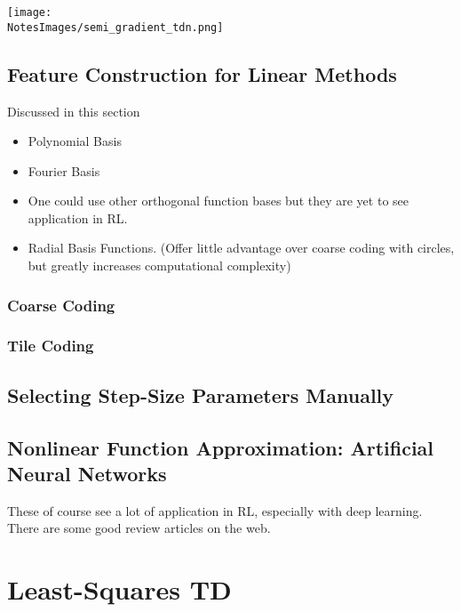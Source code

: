 \texttt{[image: \\NotesImages/semi\_gradient\_tdn.png]}\\


\subsection{Feature Construction for Linear Methods}
Discussed in this section
\begin{itemize}
    \item Polynomial Basis
    \item Fourier Basis
    \item One could use other orthogonal function bases but they are yet to see application in RL.
    \item Radial Basis Functions. (Offer little advantage over coarse coding with circles, but greatly increases computational complexity)
\end{itemize}

\setcounter{subsubsection}{2}
\subsubsection{Coarse Coding}
\subsubsection{Tile Coding}


\subsection{Selecting Step-Size Parameters Manually}


\subsection{Nonlinear Function Approximation: Artificial Neural Networks}
These of course see a lot of application in RL, especially with deep learning. There are some good review articles on the web.

\section{Least-Squares TD}











